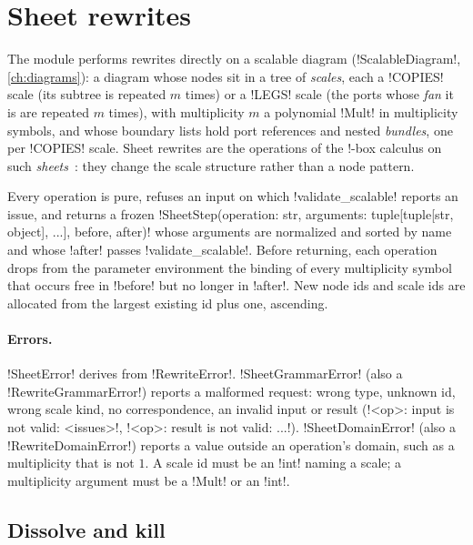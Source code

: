 \section{Sheet rewrites}\label{sec:rewriting-sheet}

The module  performs rewrites directly on a scalable diagram
(\py!ScalableDiagram!, \cref{ch:diagrams}): a diagram whose nodes sit in a tree of \emph{scales},
each a \code!COPIES! scale (its subtree is repeated $m$ times) or a \code!LEGS! scale (the ports
whose \emph{fan} it is are repeated $m$ times), with multiplicity $m$ a polynomial \py!Mult! in
multiplicity symbols, and whose boundary lists hold port references and nested \emph{bundles}, one
per \code!COPIES! scale. Sheet rewrites are the operations of the !-box calculus on such
\emph{sheets}~\cite{kissinger2014pattern}: they change the scale structure rather than a node
pattern.

Every operation is pure, refuses an input on which \py!validate_scalable! reports an issue, and
returns a frozen \py!SheetStep(operation: str, arguments: tuple[tuple[str, object], ...], before, after)!
whose arguments are normalized and sorted by name and whose \py!after! passes
\py!validate_scalable!. Before returning, each operation drops from the parameter environment the
binding of every multiplicity symbol that occurs free in \py!before! but no longer in \py!after!.
New node ids and scale ids are allocated from the largest existing id plus one, ascending.

\paragraph{Errors.}
\py!SheetError! derives from \py!RewriteError!. \py!SheetGrammarError! (also a
\py!RewriteGrammarError!) reports a malformed request: wrong type, unknown id, wrong scale kind, no
correspondence, an invalid input or result (\code!<op>: input is not valid: <issues>!,
\code!<op>: result is not valid: ...!). \py!SheetDomainError! (also a \py!RewriteDomainError!)
reports a value outside an operation's domain, such as a multiplicity that is not $1$. A scale id
must be an \py!int! naming a scale; a multiplicity argument must be a \py!Mult! or an \py!int!.

\subsection{Dissolve and kill}

